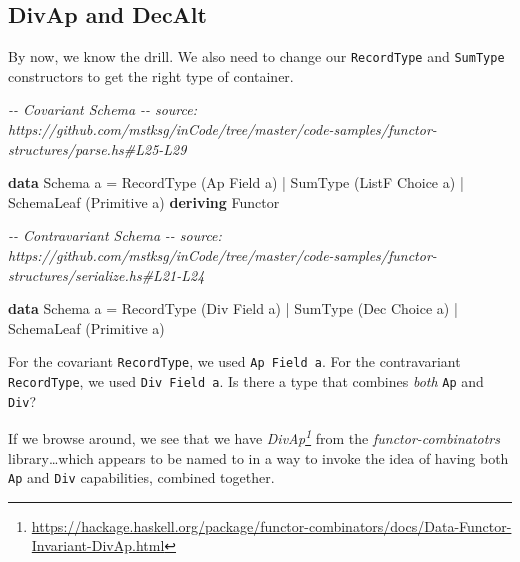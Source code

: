 \documentclass[]{article}
\newenvironment{Shaded}{}{}
\newcommand{\CommentTok}[1]{\textcolor[rgb]{0.38,0.63,0.69}{\textit{#1}}}
\newcommand{\DataTypeTok}[1]{\textcolor[rgb]{0.56,0.13,0.00}{#1}}
\newcommand{\KeywordTok}[1]{\textcolor[rgb]{0.00,0.44,0.13}{\textbf{#1}}}
\newcommand{\NormalTok}[1]{#1}
\newcommand{\OperatorTok}[1]{\textcolor[rgb]{0.40,0.40,0.40}{#1}}
\newcommand{\OtherTok}[1]{\textcolor[rgb]{0.00,0.44,0.13}{#1}}
\renewcommand{\href}[2]{#2\footnote{\url{#1}}}
\begin{document}
\hypertarget{divap-and-decalt}{%
\subsection{DivAp and DecAlt}\label{divap-and-decalt}}

By now, we know the drill. We also need to change our \texttt{RecordType} and
\texttt{SumType} constructors to get the right type of container.

\begin{Shaded}
\begin{Highlighting}[]
\CommentTok{{-}{-} Covariant Schema}
\CommentTok{{-}{-} source: https://github.com/mstksg/inCode/tree/master/code{-}samples/functor{-}structures/parse.hs\#L25{-}L29}

\KeywordTok{data} \DataTypeTok{Schema}\NormalTok{ a }\OtherTok{=}
      \DataTypeTok{RecordType}\NormalTok{  (}\DataTypeTok{Ap}    \DataTypeTok{Field}\NormalTok{  a)}
    \OperatorTok{|} \DataTypeTok{SumType}\NormalTok{     (}\DataTypeTok{ListF} \DataTypeTok{Choice}\NormalTok{ a)}
    \OperatorTok{|} \DataTypeTok{SchemaLeaf}\NormalTok{  (}\DataTypeTok{Primitive}\NormalTok{ a)}
  \KeywordTok{deriving} \DataTypeTok{Functor}
\end{Highlighting}
\end{Shaded}

\begin{Shaded}
\begin{Highlighting}[]
\CommentTok{{-}{-} Contravariant Schema}
\CommentTok{{-}{-} source: https://github.com/mstksg/inCode/tree/master/code{-}samples/functor{-}structures/serialize.hs\#L21{-}L24}

\KeywordTok{data} \DataTypeTok{Schema}\NormalTok{ a }\OtherTok{=}
      \DataTypeTok{RecordType}\NormalTok{  (}\DataTypeTok{Div} \DataTypeTok{Field}\NormalTok{  a)}
    \OperatorTok{|} \DataTypeTok{SumType}\NormalTok{     (}\DataTypeTok{Dec} \DataTypeTok{Choice}\NormalTok{ a)}
    \OperatorTok{|} \DataTypeTok{SchemaLeaf}\NormalTok{  (}\DataTypeTok{Primitive}\NormalTok{ a)}
\end{Highlighting}
\end{Shaded}

For the covariant \texttt{RecordType}, we used \texttt{Ap\ Field\ a}. For the
contravariant \texttt{RecordType}, we used \texttt{Div\ Field\ a}. Is there a
type that combines \emph{both} \texttt{Ap} and \texttt{Div}?

If we browse around, we see that we have
\emph{\href{https://hackage.haskell.org/package/functor-combinators/docs/Data-Functor-Invariant-DivAp.html}{DivAp}}
from the \emph{functor-combinatotrs} library\ldots which appears to be named to
in a way to invoke the idea of having both \texttt{Ap} and \texttt{Div}
capabilities, combined together.
\end{document}
